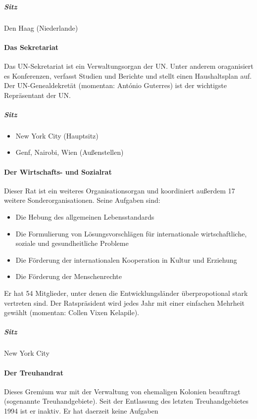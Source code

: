 \documentclass{article}
\begin{document}
	\subparagraph{Sitz}
	Den Haag (Niederlande)

	\paragraph{Das Sekretariat}
	Das UN-Sekretariat ist ein Verwaltungsorgan der UN. Unter anderem oraganisiert es Konferenzen, verfasst Studien und Berichte und stellt einen Haushaltsplan auf. Der UN-Genealdekretät (momentan: António Guterres) ist der wichtigste Repräsentant der UN.

	\subparagraph{Sitz}
	\begin{itemize}
		\item New York City (Hauptsitz)
		\item Genf, Nairobi, Wien (Außenstellen)
	\end{itemize}

	\paragraph{Der Wirtschafts- und Sozialrat}
	Dieser Rat ist ein weiteres Organisationsorgan und koordiniert außerdem 17 weitere Sonderorganisationen. Seine Aufgaben sind:

	\begin{itemize}
		\item Die Hebung des allgemeinen Lebensstandards
		\item Die Formulierung von Lösungsvorschlägen für internationale wirtschaftliche, soziale und gesundheitliche Probleme
		\item Die Förderung der internationalen Kooperation in Kultur und Erziehung
		\item Die Förderung der Menschenrechte
	\end{itemize}

	Er hat 54 Mitglieder, unter denen die Entwicklungsländer überpropotional stark vertreten sind. Der Ratspräsident wird jedes Jahr mit einer einfachen Mehrheit gewählt (momentan: Collen Vixen Kelapile). 

	\subparagraph{Sitz}
	New York City

	\paragraph{Der Treuhandrat}
	Dieses Gremium war mit der Verwaltung von ehemaligen Kolonien beauftragt (sogenannte Treuhandgebiete). Seit der Entlassung des letzten Treuhandgebietes 1994 ist er inaktiv. Er hat daerzeit keine Aufgaben
\end{document}
